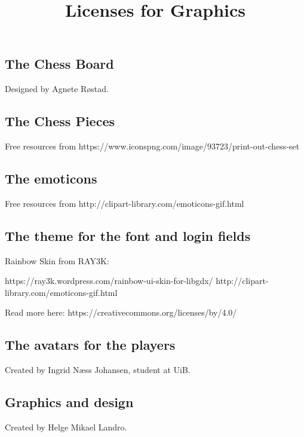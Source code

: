 \documentclass{article}
\title{Licenses for Graphics}
\begin{document}
\date{}
\maketitle
{}

\subsection*{ The Chess Board }
\begin{description}
\item Designed by Agnete Røstad.
\end{description}

\subsection*{ The Chess Pieces }
\begin{description}
\item Free resources from https://www.iconspng.com/image/93723/print-out-chess-set
\end{description}

\subsection*{ The emoticons }
\begin{description}
\item Free resources from http://clipart-library.com/emoticons-gif.html
\end{description}

\subsection*{ The theme for the font and login fields }
\begin{description}
\item Rainbow Skin from RAY3K:
\item https://ray3k.wordpress.com/rainbow-ui-skin-for-libgdx/ http://clipart-library.com/emoticons-gif.html
\item
Read more here: https://creativecommons.org/licenses/by/4.0/
\end{description}

\subsection*{ The avatars for the players }
\begin{description}
\item Created by Ingrid Næss Johansen, student at UiB.
\end{description}

\subsection*{ Graphics and design }
\begin{description}
\item Created by Helge Mikael Landro.
\end{description}
\end{document}
